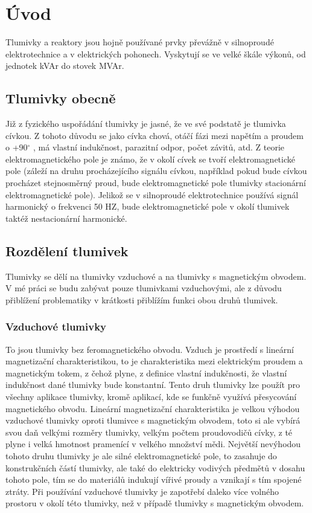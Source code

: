 \chapter{Úvod} \label{uvod}
Tlumivky a reaktory jsou hojně používané prvky převážně v silnoproudé elektrotechnice a v elektrických pohonech. Vyskytují se ve velké škále výkonů, od jednotek kVAr do stovek MVAr. 

\section{Tlumivky obecně}
Již z fyzického uspořádání tlumivky je jasné, že ve své podstatě je tlumivka cívkou. Z tohoto důvodu se jako cívka chová, otáčí fázi mezi napětím a proudem o +90$^\circ$ , má vlastní indukčnost, parazitní odpor, počet závitů, atd. Z teorie elektromagnetického pole je známo, že v okolí cívek se tvoří elektromagnetické pole (záleží na druhu procházejícího signálu cívkou, například pokud bude cívkou procházet stejnosměrný proud, bude elektromagnetické pole tlumivky stacionární elektromagnetické pole). Jelikož se v silnoproudé elektrotechnice používá signál harmonický o frekvenci 50 HZ, bude elektromagnetické pole v okolí tlumivek taktéž nestacionární harmonické. 

\section{Rozdělení tlumivek}
Tlumivky se dělí na tlumivky vzduchové a na tlumivky s magnetickým obvodem. V mé práci se budu zabývat pouze tlumivkami vzduchovými, ale z důvodu přiblížení problematiky v krátkosti přiblížím funkci obou druhů tlumivek.

\subsection{Vzduchové tlumivky}
To jsou tlumivky bez feromagnetického obvodu. Vzduch je prostředí s lineární magnetizační charakteristikou, to je charakteristika mezi elektrickým proudem a magnetickým tokem, z čehož plyne, z definice vlastní indukčnosti, že vlastní indukčnost dané tlumivky bude konstantní. Tento druh tlumivky lze použít pro všechny aplikace tlumivky, kromě aplikací, kde se funkčně využívá přesycování magnetického obvodu. Lineární magnetizační charakteristika je velkou výhodou vzduchové tlumivky oproti tlumivce s magnetickým obvodem, toto si ale vybírá svou daň velkými rozměry tlumivky, velkým počtem proudovodičů cívky, z té plyne i velká hmotnost pramenící v velkého množství mědi. Největší nevýhodou tohoto druhu tlumivky je ale silné elektromagnetické pole, to zasahuje do konstrukčních částí tlumivky, ale také do elektricky vodivých předmětů v dosahu tohoto pole, tím se do materiálů indukují vířivé proudy a vznikají s tím spojené ztráty. Při používání vzduchové tlumivky je zapotřebí daleko více volného prostoru v okolí této tlumivky, než v případě tlumivky s magnetickým obvodem.   

